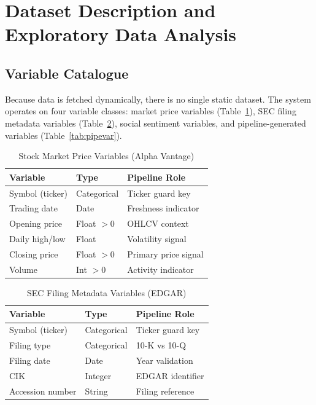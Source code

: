\documentclass[10pt,twocolumn]{article}
\begin{document}
\section{Dataset Description and Exploratory Data Analysis}
\label{sec:eda}

\subsection{Variable Catalogue}

Because data is fetched dynamically, there is no single static dataset.
The system operates on four variable classes: market price variables
(Table~\ref{tab:mktvar}), SEC filing metadata variables
(Table~\ref{tab:secvar}), social sentiment variables, and
pipeline-generated variables (Table~\ref{tab:pipevar}).

\begin{table}[htbp]
\caption{Stock Market Price Variables (Alpha Vantage)}
\label{tab:mktvar}
\centering
\small
\begin{tabular}{@{}lll@{}}
\toprule
\textbf{Variable} & \textbf{Type} & \textbf{Pipeline Role} \\
\midrule
Symbol (ticker) & Categorical & Ticker guard key \\
Trading date    & Date        & Freshness indicator \\
Opening price   & Float $>0$  & OHLCV context \\
Daily high/low  & Float       & Volatility signal \\
Closing price   & Float $>0$  & Primary price signal \\
Volume          & Int $>0$    & Activity indicator \\
\bottomrule
\end{tabular}
\end{table}

\begin{table}[htbp]
\caption{SEC Filing Metadata Variables (EDGAR)}
\label{tab:secvar}
\centering
\small
\begin{tabular}{@{}lll@{}}
\toprule
\textbf{Variable} & \textbf{Type} & \textbf{Pipeline Role} \\
\midrule
Symbol (ticker)  & Categorical & Ticker guard key \\
Filing type      & Categorical & 10-K vs 10-Q \\
Filing date      & Date        & Year validation \\
CIK              & Integer     & EDGAR identifier \\
Accession number & String      & Filing reference \\
\bottomrule
\end{tabular}
\end{table}
\end{document}
